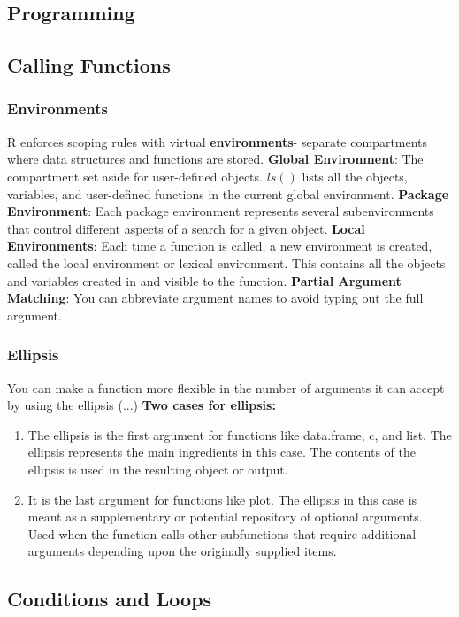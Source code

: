 \documentclass[openany]{book}
\begin{document}
\begin{flushleft}
\part{Programming}
\chapter{Calling Functions}
\section{Environments}
R enforces scoping rules with virtual \textbf{environments}- separate compartments where data structures and functions are stored. \medbreak
\textbf{Global Environment}: The compartment set aside for user-defined objects. \medbreak
$ls()$ lists all the objects, variables, and user-defined functions in the current global environment. \medbreak
\textbf{Package Environment}: Each package environment represents several subenvironments that control different aspects of a search for a given object. \medbreak
\textbf{Local Environments}: Each time a function is called, a new environment is created, called the local environment or lexical environment. This contains all the objects and variables created in and visible to the function. \medbreak
\textbf{Partial Argument Matching}: You can abbreviate argument names to avoid typing out the full argument.
\section{Ellipsis}
You can make a function more flexible in the number of arguments it can accept by using the ellipsis (...) \medbreak
\textbf{Two cases for ellipsis:}
\begin{enumerate}
\item The ellipsis is the first argument for functions like data.frame, c, and list. The ellipsis represents the main ingredients in this case. The contents of the ellipsis is used in the resulting object or output.

\item It is the last argument for functions like plot. The ellipsis in this case is meant as a supplementary or potential repository of optional arguments. Used when the function calls other subfunctions that require additional arguments depending upon the originally supplied items.
\end{enumerate}

\chapter{Conditions and Loops}

\end{flushleft}
\end{document}
